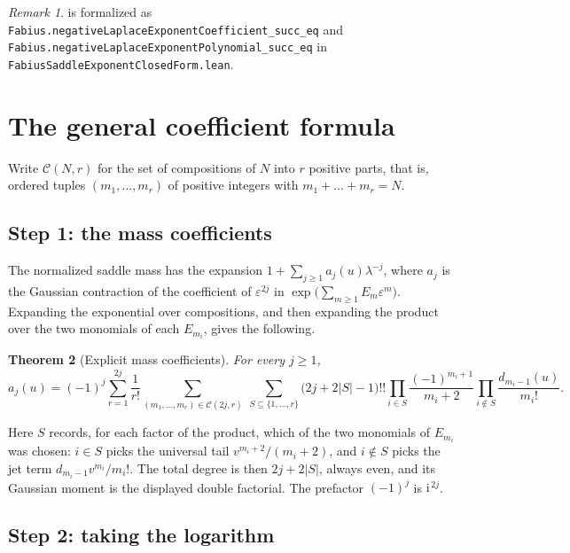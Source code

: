 \documentclass[11pt,oneside]{article}
\newtheorem{theorem}{Theorem}[section]
\theoremstyle{definition}
\theoremstyle{remark}
\newtheorem{remark}[theorem]{Remark}
\newcommand{\ii}{\mathrm i}
\begin{document}
\begin{remark}
 is formalized as
\lstinline[style=pseudo]{Fabius.negativeLaplaceExponentCoefficient_succ_eq}
and
\lstinline[style=pseudo]{Fabius.negativeLaplaceExponentPolynomial_succ_eq}
in \nolinkurl{FabiusSaddleExponentClosedForm.lean}.
\end{remark}

\section{The general coefficient formula}\label{sec:general}

Write $\mathcal C(N,r)$ for the set of compositions of $N$ into $r$ positive
parts, that is, ordered tuples $(m_1,\dots,m_r)$ of positive integers with
$m_1+\dots+m_r=N$.

\subsection{Step 1: the mass coefficients}

The normalized saddle mass has the expansion
$1+\sum_{j\ge1}a_j(u)\lambda^{-j}$, where $a_j$ is the Gaussian contraction of
the coefficient of $\varepsilon^{2j}$ in
$\exp\bigl(\sum_{m\ge1}E_m\varepsilon^m\bigr)$.  Expanding the exponential over
compositions, and then expanding the product over the two monomials of each
$E_{m_i}$, gives the following.

\begin{theorem}[Explicit mass coefficients]\label{thm:mass}
For every $j\ge1$,
\[
  a_j(u)=(-1)^j\sum_{r=1}^{2j}\frac1{r!}
    \sum_{(m_1,\dots,m_r)\in\mathcal C(2j,r)}\ \sum_{S\subseteq\{1,\dots,r\}}
      \bigl(2j+2|S|-1\bigr)!!
      \prod_{i\in S}\frac{(-1)^{m_i+1}}{m_i+2}
      \prod_{i\notin S}\frac{d_{m_i-1}(u)}{m_i!}.
\]
\end{theorem}

Here $S$ records, for each factor of the product, which of the two monomials of
$E_{m_i}$ was chosen: $i\in S$ picks the universal tail
$v^{m_i+2}/(m_i+2)$, and $i\notin S$ picks the jet term
$d_{m_i-1}v^{m_i}/m_i!$.  The total degree is then $2j+2|S|$, always even, and
its Gaussian moment is the displayed double factorial.  The prefactor $(-1)^j$
is $\ii^{\,2j}$.

\subsection{Step 2: taking the logarithm}
\end{document}
